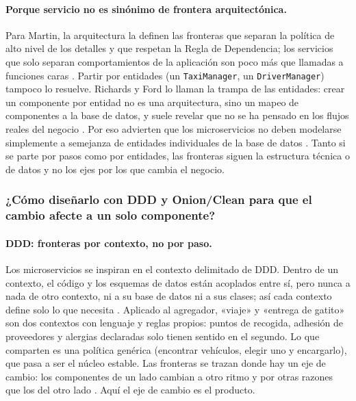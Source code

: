 \paragraph{Porque servicio no es sinónimo de frontera arquitectónica.} Para Martin, la arquitectura
la definen las fronteras que separan la política de alto nivel de los detalles y que respetan la
Regla de Dependencia; los servicios que solo separan comportamientos de la aplicación son poco más
que llamadas a funciones caras \parencite[p.~240]{martin2017clean}. Partir por entidades (un
\texttt{TaxiManager}, un \texttt{DriverManager}) tampoco lo resuelve. Richards y Ford lo llaman la
trampa de las entidades: crear un componente por entidad no es una arquitectura, sino un mapeo de
componentes a la base de datos, y suele revelar que no se ha pensado en los flujos reales del
negocio \parencite[cap.~8]{richards2020fundamentals}. Por eso advierten que los microservicios no
deben modelarse simplemente a semejanza de entidades individuales de la base de datos
\parencite[cap.~17]{richards2020fundamentals}. Tanto si se parte por pasos como por entidades, las
fronteras siguen la estructura técnica o de datos y no los ejes por los que cambia el negocio.

\subsubsection{¿Cómo diseñarlo con DDD y Onion/Clean para que el cambio afecte a un solo componente?}

\paragraph{DDD: fronteras por contexto, no por paso.} Los microservicios se inspiran en el contexto
delimitado de DDD. Dentro de un contexto, el código y los esquemas de datos están acoplados entre sí,
pero nunca a nada de otro contexto, ni a su base de datos ni a sus clases; así cada contexto define
solo lo que necesita \parencite[cap.~17]{richards2020fundamentals}. Aplicado al agregador, «viaje» y
«entrega de gatito» son dos contextos con lenguaje y reglas propios: puntos de recogida, adhesión
de proveedores y alergias declaradas solo tienen sentido en el segundo. Lo que comparten es una
política genérica (encontrar vehículos, elegir uno y encargarlo), que pasa a ser el núcleo estable.
Las fronteras se trazan donde hay un eje de cambio: los componentes de un lado cambian a otro ritmo
y por otras razones que los del otro lado \parencite[p.~173]{martin2017clean}. Aquí el eje de cambio
es el producto.

